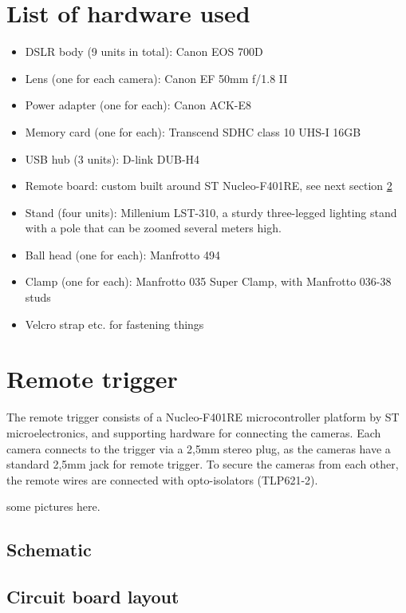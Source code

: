 \section{List of hardware used} \label{app:hardwareused}

\begin{itemize}
	\item DSLR body (9 units in total): Canon EOS 700D
	\item Lens (one for each camera): Canon EF 50mm f/1.8 II
	\item Power adapter (one for each): Canon ACK-E8
	\item Memory card (one for each): Transcend SDHC class 10 UHS-I 16GB
	\item USB hub (3 units): D-link DUB-H4
	\item Remote board: custom built around ST Nucleo-F401RE, see next section \ref{app:remotetrigger}
	\item Stand (four units): Millenium LST-310, a sturdy three-legged lighting stand with a pole that can be zoomed several meters high.
	\item Ball head (one for each): Manfrotto 494
	\item Clamp (one for each): Manfrotto 035 Super Clamp, with Manfrotto 036-38 studs
	\item Velcro strap etc. for fastening things
\end{itemize}


\section{Remote trigger} \label{app:remotetrigger}

The remote trigger consists of a Nucleo-F401RE microcontroller platform by ST microelectronics, and supporting hardware for connecting the cameras.
Each camera connects to the trigger via a 2,5mm stereo plug, as the cameras have a standard 2,5mm jack for remote trigger.
To secure the cameras from each other, the remote wires are connected with opto-isolators (TLP621-2).

some pictures here.

\subsection{Schematic}


\subsection{Circuit board layout}

